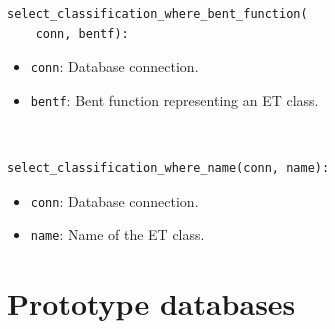 \documentclass[pdf,sprung,slideColor,nocolorBG]{beamer}
\newenvironment{colortheme}[1]{
\def\ProvidesPackageRCS $##1${\relax}
\renewcommand{\ProcessOptions}{\relax}
\makeatletter

\makeatother
}{}
\begin{document}
\begin{colortheme}{jubata}
\begin{frame}[fragile]
\begin{verbatim}
select_classification_where_bent_function(
    conn, bentf):
\end{verbatim}
\begin{itemize}
 \item \texttt{conn}: Database connection.
 \item \texttt{bentf}: Bent function representing an ET class.
\end{itemize}

~

\begin{verbatim}
select_classification_where_name(conn, name):
\end{verbatim}
\begin{itemize}
 \item \texttt{conn}: Database connection.
 \item \texttt{name}: Name of the ET class.
\end{itemize}

\end{frame}

\end{colortheme}

\section{Prototype databases}
\end{document}

